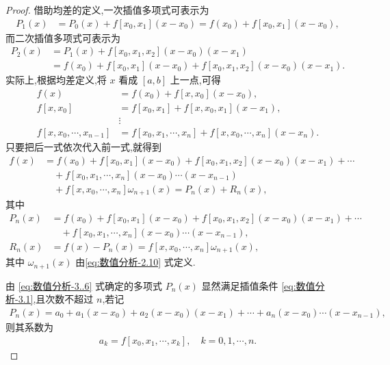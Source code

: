 \documentclass[../../main.tex]{subfiles}
\begin{document}
\begin{proof}
借助均差的定义,一次插值多项式可表示为
\begin{align*}
P_1(x) &= P_0(x) + f[x_0, x_1](x - x_0) = f(x_0) + f[x_0, x_1](x - x_0),
\end{align*}
而二次插值多项式可表示为
\begin{align*}
P_2(x) &= P_1(x) + f[x_0, x_1, x_2](x - x_0)(x - x_1) \\
&= f(x_0) + f[x_0, x_1](x - x_0) + f[x_0, x_1, x_2](x - x_0)(x - x_1).
\end{align*}
实际上,根据均差定义,将 $x$ 看成 $[a, b]$ 上一点,可得
\begin{align*}
f(x) &= f(x_0) + f[x, x_0](x - x_0), \\
f[x, x_0] &= f[x_0, x_1] + f[x, x_0, x_1](x - x_1), \\
&\vdots \\
f[x, x_0, \cdots, x_{n-1}] &= f[x_0, x_1, \cdots, x_n] + f[x, x_0, \cdots, x_n](x - x_n).
\end{align*}
只要把后一式依次代入前一式,就得到
\begin{align*}
f(x) &= f(x_0) + f[x_0, x_1](x - x_0) + f[x_0, x_1, x_2](x - x_0)(x - x_1) + \cdots \\
&\quad + f[x_0, x_1, \cdots, x_n](x - x_0) \cdots (x - x_{n-1}) \\
&\quad + f[x, x_0, \cdots, x_n]\omega_{n+1}(x) = P_n(x) + R_n(x),
\end{align*}
其中
\begin{align}
P_n(x) &= f(x_0) + f[x_0, x_1](x - x_0) + f[x_0, x_1, x_2](x - x_0)(x - x_1) + \cdots \nonumber \\
&\quad + f[x_0, x_1, \cdots, x_n](x - x_0) \cdots (x - x_{n-1}),\label{eq:数值分析-3..6} \\
R_n(x) &= f(x) - P_n(x) = f[x, x_0, \cdots, x_n]\omega_{n+1}(x), \nonumber 
\end{align}
其中 $\omega_{n+1}(x)$ 由\eqref{eq:数值分析-2.10} 式定义.

由 \eqref{eq:数值分析-3..6} 式确定的多项式 $P_n(x)$ 显然满足插值条件 \eqref{eq:数值分析-3.1},且次数不超过 $n$,若记
\begin{align*}
P_n(x)=a_0+a_1(x-x_0)+a_2(x-x_0)(x-x_1)+\cdots+a_n(x-x_0)\cdots(x-x_{n-1}),
\end{align*}
则其系数为
\begin{align*}
a_k = f[x_0, x_1, \cdots, x_k], \quad k = 0, 1, \cdots, n.
\end{align*}

\end{proof}
\end{document}
